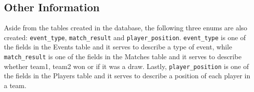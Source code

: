 \subsection{Other Information}

Aside from the tables created in the database, the following three enums are also created:
\texttt{event\_type}, \texttt{match\_result} and \texttt{player\_position}. \texttt{event\_type} is one of the fields in the Events table and it serves to describe a type of event, while \texttt{match\_result} is one of the fields in the Matches table and it serves to describe whether team1, team2 won or if it was a draw. Lastly, \texttt{player\_position} is one of the fields in the Players table and it serves to describe a position of each player in a team.
